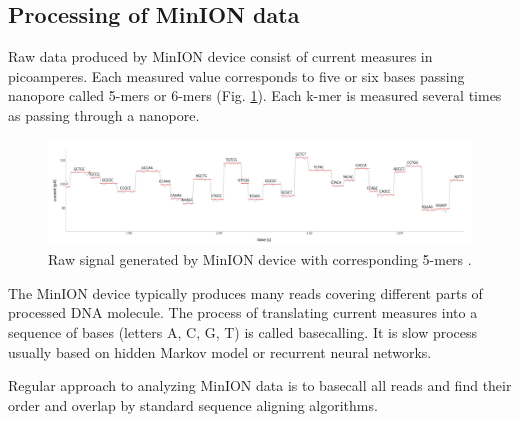 \subsection{Processing of MinION data}
\label{standard}
Raw data produced by MinION device consist of current measures in picoamperes.
Each measured value corresponds to five or six bases passing nanopore called 5-mers or 6-mers (Fig. \ref{fig:kmers}).
Each k-mer is measured several times as passing through a nanopore.

\begin{figure}
  \centering
  \includegraphics[width=1.0\textwidth]{images/kmers}
  \caption{Raw signal generated by MinION device with corresponding 5-mers \cite{kmersimage}.}
  \label{fig:kmers}
\end{figure}

The MinION device typically produces many reads covering different parts of processed DNA molecule.
The process of translating current measures into a sequence of bases (letters A, C, G, T) is called basecalling. 
It is slow process usually based on hidden Markov model or recurrent neural networks. 

Regular approach to analyzing MinION data is to basecall all reads and find their order and overlap by standard 
sequence aligning algorithms.